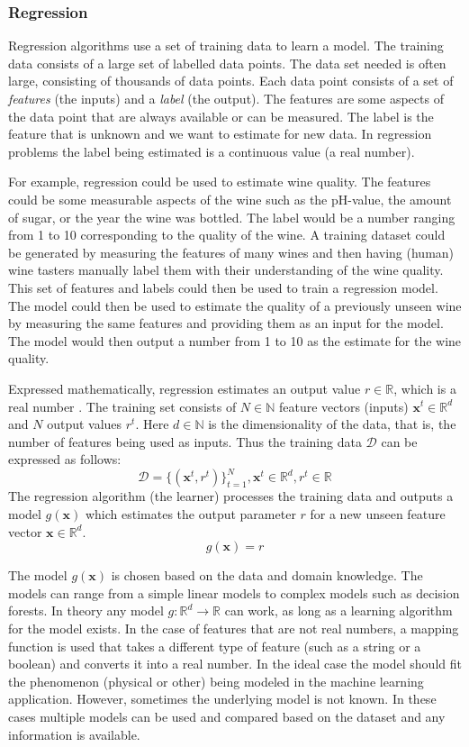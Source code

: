 \subsubsection{Regression}

Regression algorithms use a set of training data to learn a model.
The training data consists of a large set of labelled data points.
The data set needed is often large, consisting of thousands of data points.
Each data point consists of a set of \emph{features} (the inputs) and a \emph{label} (the output).
The features are some aspects of the data point that are always available or can be measured.
The label is the feature that is unknown and we want to estimate for new data.
In regression problems the label being estimated is a continuous value (a real number).

For example, regression could be used to estimate wine quality.
The features could be some measurable aspects of the wine such as the pH-value, the amount of sugar, or the year the wine was bottled.
The label would be a number ranging from 1 to 10 corresponding to the quality of the wine.
A training dataset could be generated by measuring the features of many wines and then having (human) wine tasters manually label them with their understanding of the wine quality.
This set of features and labels could then be used to train a regression model.
The model could then be used to estimate the quality of a previously unseen wine by measuring the same features and providing them as an input for the model.
The model would then output a number from 1 to 10 as the estimate for the wine quality.

Expressed mathematically, regression estimates an output value $r \in \mathbb{R}$, which is a real number \cite{alpaydin}.
The training set consists of $N \in \mathbb{N}$ feature vectors (inputs) $\mathbf{x}^t \in \mathbb{R}^d$ and $N$ output values $r^t$.
Here $d \in \mathbb{N}$ is the dimensionality of the data, that is, the number of features being used as inputs. Thus the training data $\mathcal{D}$ can be expressed as follows:
$$\mathcal{D} = \{(\mathbf{x}^t, r^t)\}_{t=1}^N, \mathbf{x}^t \in \mathbb{R}^d, r^t \in \mathbb{R}$$
The regression algorithm (the learner) processes the training data and outputs a model $g(\mathbf{x})$ which estimates the output parameter $r$ for a new unseen feature vector $\mathbf{x} \in \mathbb{R}^d$.
$$g(\mathbf{x}) = r$$

The model $g(\mathbf{x})$ is chosen based on the data and domain knowledge. 
The models can range from a simple linear models to complex models such as decision forests.
In theory any model $g: \mathbb{R}^d \rightarrow \mathbb{R}$ can work,
as long as a learning algorithm for the model exists.
In the case of features that are not real numbers, a mapping function is used that takes a different type of feature (such as a string or a boolean) and converts it into a real number.
In the ideal case the model should fit the phenomenon (physical or other) being modeled in the machine learning application.
However, sometimes the underlying model is not known. 
In these cases multiple models can be used and compared based on the dataset and any information is available.

